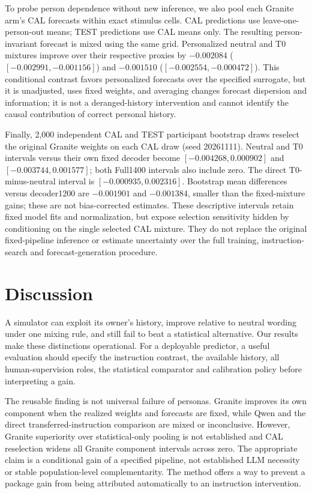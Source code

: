 \documentclass[11pt]{article}
\begin{document}
To probe person dependence without new inference, we also pool each Granite arm's CAL forecasts within exact stimulus cells. CAL predictions use leave-one-person-out means; TEST predictions use CAL means only. The resulting person-invariant forecast is mixed using the same grid. Personalized neutral and T0 mixtures improve over their respective proxies by $-0.002084$ ($[-0.002991,-0.001156]$) and $-0.001510$ ($[-0.002554,-0.000472]$). This conditional contrast favors personalized forecasts over the specified surrogate, but it is unadjusted, uses fixed weights, and averaging changes forecast dispersion and information; it is not a deranged-history intervention and cannot identify the causal contribution of correct personal history.

Finally, 2,000 independent CAL and TEST participant bootstrap draws reselect the original Granite weights on each CAL draw (seed 20261111). Neutral and T0 intervals versus their own fixed decoder become $[-0.004268,0.000902]$ and $[-0.003744,0.001577]$; both Full1400 intervals also include zero. The direct T0-minus-neutral interval is $[-0.000935,0.002316]$. Bootstrap mean differences versus decoder1200 are $-0.001901$ and $-0.001384$, smaller than the fixed-mixture gains; these are not bias-corrected estimates. These descriptive intervals retain fixed model fits and normalization, but expose selection sensitivity hidden by conditioning on the single selected CAL mixture. They do not replace the original fixed-pipeline inference or estimate uncertainty over the full training, instruction-search and forecast-generation procedure.

\section{Discussion}
A simulator can exploit its owner's history, improve relative to neutral wording under one mixing rule, and still fail to beat a statistical alternative. Our results make these distinctions operational. For a deployable predictor, a useful evaluation should specify the instruction contrast, the available history, all human-supervision roles, the statistical comparator and calibration policy before interpreting a gain.

The reusable finding is not universal failure of personas. Granite improves its own component when the realized weights and forecasts are fixed, while Qwen and the direct transferred-instruction comparison are mixed or inconclusive. However, Granite superiority over statistical-only pooling is not established and CAL reselection widens all Granite component intervals across zero. The appropriate claim is a conditional gain of a specified pipeline, not established LLM necessity or stable population-level complementarity. The method offers a way to prevent a package gain from being attributed automatically to an instruction intervention.
\end{document}
